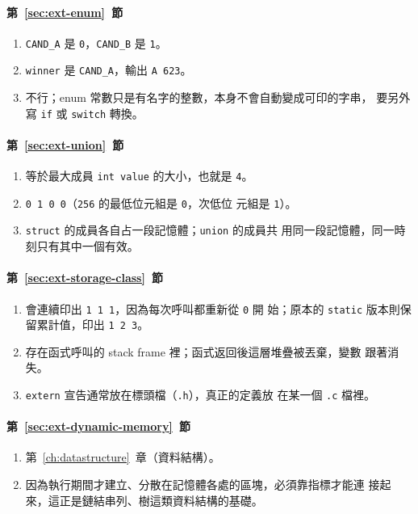 \paragraph{第~\ref{sec:ext-enum}~節}
\begin{enumerate}
\item \texttt{CAND\_A} 是 \texttt{0}，\texttt{CAND\_B} 是 \texttt{1}。
\item \texttt{winner} 是 \texttt{CAND\_A}，輸出 \texttt{A 623}。
\item 不行；enum 常數只是有名字的整數，本身不會自動變成可印的字串，
要另外寫 \texttt{if} 或 \texttt{switch} 轉換。
\end{enumerate}

\paragraph{第~\ref{sec:ext-union}~節}
\begin{enumerate}
\item 等於最大成員 \texttt{int value} 的大小，也就是 \texttt{4}。
\item \texttt{0 1 0 0}（\texttt{256} 的最低位元組是 \texttt{0}，次低位
元組是 \texttt{1}）。
\item \texttt{struct} 的成員各自占一段記憶體；\texttt{union} 的成員共
用同一段記憶體，同一時刻只有其中一個有效。
\end{enumerate}

\paragraph{第~\ref{sec:ext-storage-class}~節}
\begin{enumerate}
\item 會連續印出 \texttt{1 1 1}，因為每次呼叫都重新從 \texttt{0} 開
始；原本的 \texttt{static} 版本則保留累計值，印出 \texttt{1 2 3}。
\item 存在函式呼叫的 stack frame 裡；函式返回後這層堆疊被丟棄，變數
跟著消失。
\item \texttt{extern} 宣告通常放在標頭檔（\texttt{.h}），真正的定義放
在某一個 \texttt{.c} 檔裡。
\end{enumerate}

\paragraph{第~\ref{sec:ext-dynamic-memory}~節}
\begin{enumerate}
\item 第~\ref{ch:datastructure}~章（資料結構）。
\item 因為執行期間才建立、分散在記憶體各處的區塊，必須靠指標才能連
接起來，這正是鏈結串列、樹這類資料結構的基礎。
\end{enumerate}

